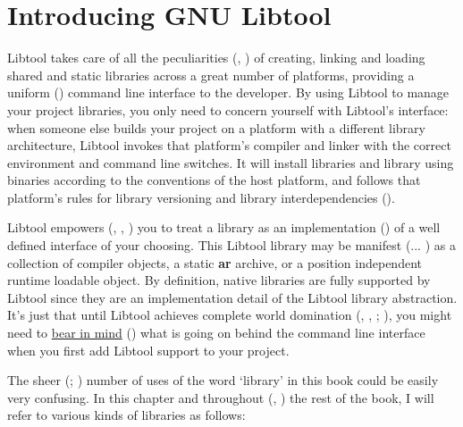 \chapter{Introducing GNU Libtool}\label{C_Introducing_GNU_Libtool}


Libtool takes care of all the peculiarities ({\MbQ{}}, {\MbQ{}}) of creating,
linking and loading shared and static libraries across a great number of 
platforms, providing a uniform ({\McQ{}}) command line interface to the developer.
By using Libtool to manage your project libraries, you only need to concern 
yourself with Libtool's interface: when someone else builds your project on a 
platform with a different library architecture, Libtool invokes that 
platform's compiler and linker with the correct environment and command line 
switches. It will install libraries and library using binaries according to 
the conventions of the host platform, and follows that platform's rules for 
library versioning and library interdependencies ({\MdQ{}}). 



Libtool empowers ({\MfQ{}}, {\MaQ{}}, {\MaQ{}}) you to treat a library as an 
implementation ({\MaQ{}}) of a well defined interface of your choosing. This 
Libtool library may be manifest ({\MfQ{}}... {\MaQ{}}) as a collection of compiler 
objects, a static \textbf{ar} archive, or a position independent runtime 
loadable object. By definition, native libraries are fully supported by 
Libtool since they are an implementation detail of the Libtool library 
abstraction. It's just that until Libtool achieves complete world domination
({\MbQ{}}, {\McQ{}}, {\MfQ{}}; {\MaQ{}}), you might need to \underline{bear in mind} ({\McQ{}})
what is going on behind the command line interface when you first add 
Libtool support to your project. 

The sheer ({\MaQ{}}; {\MhQ{}}) number of uses of the word `library' in this book 
could be easily very confusing. In this chapter and throughout ({\MjQ{}}, {\MjQ{}})
the rest of the book, I will refer to various kinds of libraries as follows: 

